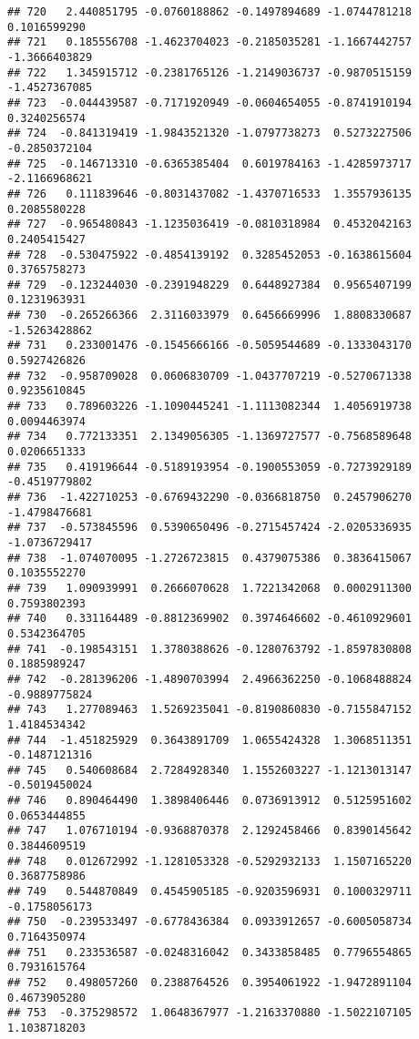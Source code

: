 \documentclass[
]{article}
\begin{document}
\begin{verbatim}
## 720   2.440851795 -0.0760188862 -0.1497894689 -1.0744781218  0.1016599290
## 721   0.185556708 -1.4623704023 -0.2185035281 -1.1667442757 -1.3666403829
## 722   1.345915712 -0.2381765126 -1.2149036737 -0.9870515159 -1.4527367085
## 723  -0.044439587 -0.7171920949 -0.0604654055 -0.8741910194  0.3240256574
## 724  -0.841319419 -1.9843521320 -1.0797738273  0.5273227506 -0.2850372104
## 725  -0.146713310 -0.6365385404  0.6019784163 -1.4285973717 -2.1166968621
## 726   0.111839646 -0.8031437082 -1.4370716533  1.3557936135  0.2085580228
## 727  -0.965480843 -1.1235036419 -0.0810318984  0.4532042163  0.2405415427
## 728  -0.530475922 -0.4854139192  0.3285452053 -0.1638615604  0.3765758273
## 729  -0.123244030 -0.2391948229  0.6448927384  0.9565407199  0.1231963931
## 730  -0.265266366  2.3116033979  0.6456669996  1.8808330687 -1.5263428862
## 731   0.233001476 -0.1545666166 -0.5059544689 -0.1333043170  0.5927426826
## 732  -0.958709028  0.0606830709 -1.0437707219 -0.5270671338  0.9235610845
## 733   0.789603226 -1.1090445241 -1.1113082344  1.4056919738  0.0094463974
## 734   0.772133351  2.1349056305 -1.1369727577 -0.7568589648  0.0206651333
## 735   0.419196644 -0.5189193954 -0.1900553059 -0.7273929189 -0.4519779802
## 736  -1.422710253 -0.6769432290 -0.0366818750  0.2457906270 -1.4798476681
## 737  -0.573845596  0.5390650496 -0.2715457424 -2.0205336935 -1.0736729417
## 738  -1.074070095 -1.2726723815  0.4379075386  0.3836415067  0.1035552270
## 739   1.090939991  0.2666070628  1.7221342068  0.0002911300  0.7593802393
## 740   0.331164489 -0.8812369902  0.3974646602 -0.4610929601  0.5342364705
## 741  -0.198543151  1.3780388626 -0.1280763792 -1.8597830808  0.1885989247
## 742  -0.281396206 -1.4890703994  2.4966362250 -0.1068488824 -0.9889775824
## 743   1.277089463  1.5269235041 -0.8190860830 -0.7155847152  1.4184534342
## 744  -1.451825929  0.3643891709  1.0655424328  1.3068511351 -0.1487121316
## 745   0.540608684  2.7284928340  1.1552603227 -1.1213013147 -0.5019450024
## 746   0.890464490  1.3898406446  0.0736913912  0.5125951602  0.0653444855
## 747   1.076710194 -0.9368870378  2.1292458466  0.8390145642  0.3844609519
## 748   0.012672992 -1.1281053328 -0.5292932133  1.1507165220  0.3687758986
## 749   0.544870849  0.4545905185 -0.9203596931  0.1000329711 -0.1758056173
## 750  -0.239533497 -0.6778436384  0.0933912657 -0.6005058734  0.7164350974
## 751   0.233536587 -0.0248316042  0.3433858485  0.7796554865  0.7931615764
## 752   0.498057260  0.2388764526  0.3954061922 -1.9472891104  0.4673905280
## 753  -0.375298572  1.0648367977 -1.2163370880 -1.5022107105  1.1038718203

\end{verbatim}
\end{document}
